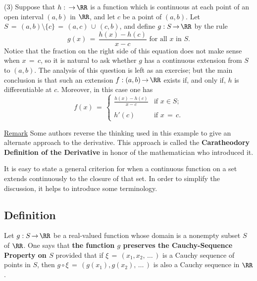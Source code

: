         (3) Suppose that $h: \,{\rightarrow}\, {\RR}$ is a function which is continuous at each point of an open interval $(a,b)$ in ${\RR}$, and let $c$ be a point of $(a,b)$.
    Let $S \,=\, (a,b){\setminus}\{c\} \,=\, (a,c)\,{\cup}\,(c,b)$, and define $g:S \,{\rightarrow}\, {\RR}$ by the rule
        \begin{displaymath}
        g(x) \,=\, \frac{h(x)-h(c)}{x-c} \mbox{ for all $x$ in $S$}.
        \end{displaymath}
    Notice that the fraction on the right side of this equation does not make sense when $x \,=\, c$,
    so it is natural to ask whether $g$ has a continuous extension from $S$ to $(a,b)$.
    The analysis of this question is left as an exercise; but the main conclusion is that such an extension $f:(a,b) \,{\rightarrow}\, {\RR}$ exists if, and only if, $h$ is differentiable at $c$.
    Moreover, in this case one has
        \begin{displaymath}
        f(x) \,=\, \left\{
        \begin{array}{cl}
        {\displaystyle \frac{h(x)-h(c)}{x-c}} & \mbox{if $x{\in}S$}; \\
                                              &                      \\
                        h'(c)                 & \mbox{if $x \,=\, c$}.
        \end{array}
            \right.
        \end{displaymath}

        \underline{Remark} Some authors reverse the thinking used in this example to give an alternate approach to the derivative. This approach is called the {\bf Caratheodory Definition of the Derivative} in honor of the mathematician who introduced it.


\V
\V

        It is easy to state a general criterion for when a continuous function on a set extends continuously to the closure of that set.
    In order to simplify the discussion, it helps to introduce some terminology.

\V

            \subsection{\small{\bf Definition}}
            \label{DefF20.60}

        Let $g:S \,{\rightarrow}\, {\RR}$ be a real-valued function whose domain is a nonempty subset $S$ of ${\RR}$.
    One says that {\bf the function $g$ preserves the Cauchy-Sequence Property on $S$}
    provided that if ${\xi} \,=\, (x_{1},x_{2},\,{\ldots}\,)$ is a Cauchy sequence of points in $S$,
    then $g{\circ}{\xi} \,=\, (g(x_{1}),g(x_{2}),\,{\ldots}\,)$ is also a Cauchy sequence in ${\RR}$.


